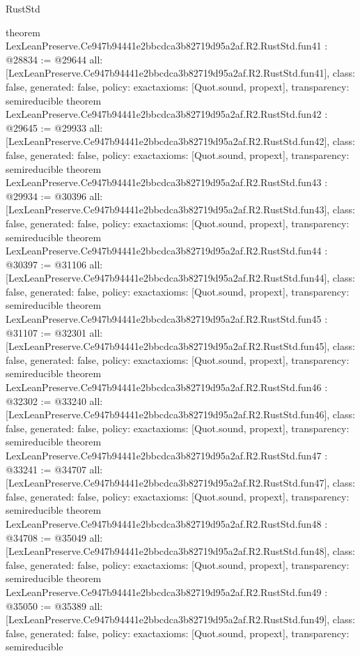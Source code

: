 \begin{lexlean}{RustStd}
\begin{coremodule}
{}
theorem LexLeanPreserve.Ce947b94441e2bbcdca3b82719d95a2af.R2.RustStd.fun41 : @28834 := @29644 {
  all: [LexLeanPreserve.Ce947b94441e2bbcdca3b82719d95a2af.R2.RustStd.fun41],
  class: false,
  generated: false,
  policy: exact{axioms: [Quot.sound, propext]},
  transparency: semireducible
}
theorem LexLeanPreserve.Ce947b94441e2bbcdca3b82719d95a2af.R2.RustStd.fun42 : @29645 := @29933 {
  all: [LexLeanPreserve.Ce947b94441e2bbcdca3b82719d95a2af.R2.RustStd.fun42],
  class: false,
  generated: false,
  policy: exact{axioms: [Quot.sound, propext]},
  transparency: semireducible
}
theorem LexLeanPreserve.Ce947b94441e2bbcdca3b82719d95a2af.R2.RustStd.fun43 : @29934 := @30396 {
  all: [LexLeanPreserve.Ce947b94441e2bbcdca3b82719d95a2af.R2.RustStd.fun43],
  class: false,
  generated: false,
  policy: exact{axioms: [Quot.sound, propext]},
  transparency: semireducible
}
theorem LexLeanPreserve.Ce947b94441e2bbcdca3b82719d95a2af.R2.RustStd.fun44 : @30397 := @31106 {
  all: [LexLeanPreserve.Ce947b94441e2bbcdca3b82719d95a2af.R2.RustStd.fun44],
  class: false,
  generated: false,
  policy: exact{axioms: [Quot.sound, propext]},
  transparency: semireducible
}
theorem LexLeanPreserve.Ce947b94441e2bbcdca3b82719d95a2af.R2.RustStd.fun45 : @31107 := @32301 {
  all: [LexLeanPreserve.Ce947b94441e2bbcdca3b82719d95a2af.R2.RustStd.fun45],
  class: false,
  generated: false,
  policy: exact{axioms: [Quot.sound, propext]},
  transparency: semireducible
}
theorem LexLeanPreserve.Ce947b94441e2bbcdca3b82719d95a2af.R2.RustStd.fun46 : @32302 := @33240 {
  all: [LexLeanPreserve.Ce947b94441e2bbcdca3b82719d95a2af.R2.RustStd.fun46],
  class: false,
  generated: false,
  policy: exact{axioms: [Quot.sound, propext]},
  transparency: semireducible
}
theorem LexLeanPreserve.Ce947b94441e2bbcdca3b82719d95a2af.R2.RustStd.fun47 : @33241 := @34707 {
  all: [LexLeanPreserve.Ce947b94441e2bbcdca3b82719d95a2af.R2.RustStd.fun47],
  class: false,
  generated: false,
  policy: exact{axioms: [Quot.sound, propext]},
  transparency: semireducible
}
theorem LexLeanPreserve.Ce947b94441e2bbcdca3b82719d95a2af.R2.RustStd.fun48 : @34708 := @35049 {
  all: [LexLeanPreserve.Ce947b94441e2bbcdca3b82719d95a2af.R2.RustStd.fun48],
  class: false,
  generated: false,
  policy: exact{axioms: [Quot.sound, propext]},
  transparency: semireducible
}
theorem LexLeanPreserve.Ce947b94441e2bbcdca3b82719d95a2af.R2.RustStd.fun49 : @35050 := @35389 {
  all: [LexLeanPreserve.Ce947b94441e2bbcdca3b82719d95a2af.R2.RustStd.fun49],
  class: false,
  generated: false,
  policy: exact{axioms: [Quot.sound, propext]},
  transparency: semireducible
}
\end{coremodule}
\end{lexlean}
